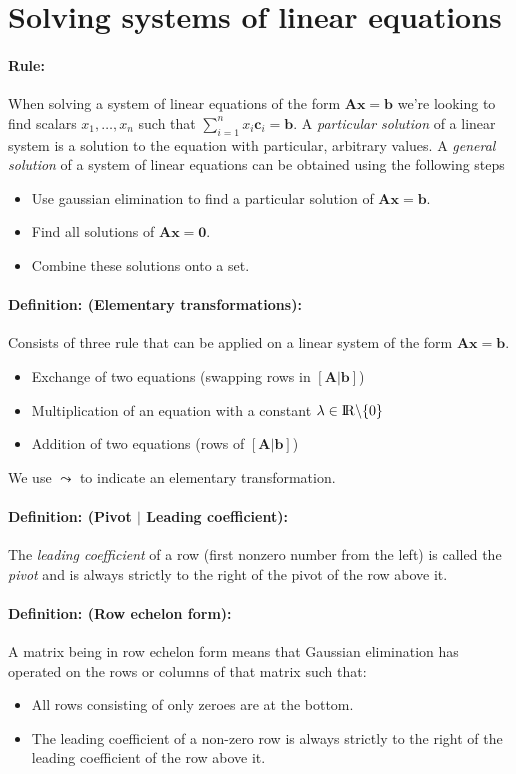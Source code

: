 \documentclass[12pt]{article}
\newcommand{\R}{{\rm I\!R}}
\newcommand{\A}{{\bm{A}}}
\newcommand{\xdefinition}[2]{\paragraph{\colorbox{#1!30}{\textbf{Definition:}} (#2):}}
\newcommand{\xrule}[1]{\paragraph{\colorbox{#1!30}{\textbf{Rule:}}}}
\begin{document}
\section{Solving systems of linear equations}

\xrule{green} When solving a system of linear equations of the form $\bm{Ax} = \bm{b}$ we're looking to find scalars $x_1, \dots, x_n$ such that $\sum\nolimits_{i=1}^{n} x_i \bm{c}_i = \bm{b}$. A \textit{particular solution} of a linear system is a solution to the equation with particular, arbitrary values. A \textit{general solution} of a system of linear equations can be obtained using the following steps
%
\begin{itemize}
	\item Use gaussian elimination to find a particular solution of $\A \bm{x} = \bm{b}$.
	\item Find all solutions of $\A\bm{x} = \bm{0}$.
	\item Combine these solutions onto a set.
\end{itemize}

\xdefinition{green}{Elementary transformations} Consists of three rule that can be applied on a linear system of the form $\A \bm{x} = \bm{b}$.
%
\begin{itemize}
	\item Exchange of two equations (swapping rows in $[\A | \bm{b}]$)
	\item Multiplication of an equation with a constant $\lambda \in \R \backslash \{0\}$
	\item Addition of two equations (rows of $[\A | \bm{b}]$)
\end{itemize}
%
We use $\leadsto$ to indicate an elementary transformation.

\xdefinition{green}{Pivot $|$ Leading coefficient} The \textit{leading coefficient} of a row (first nonzero number from the left) is called the \textit{pivot} and is always strictly to the right of the pivot of the row above it.

\xdefinition{green}{Row echelon form} A matrix being in row echelon form means that Gaussian elimination has operated on the rows or columns of that matrix such that:
%
\begin{itemize}
	\item All rows consisting of only zeroes are at the bottom.
	\item The leading coefficient of a non-zero row is always strictly to the right of the leading coefficient of the row above it.
\end{itemize}
\end{document}
